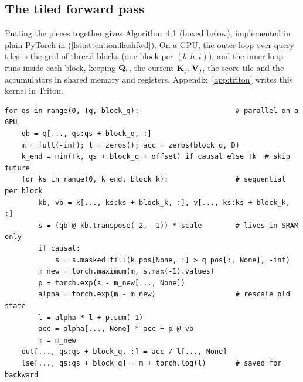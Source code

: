 \subsection{The tiled forward pass}
Putting the pieces together gives Algorithm~4.1 (boxed below), implemented in plain PyTorch in
 (\cref{lst:attention:flashfwd}). On a GPU, the outer loop over query tiles is
the grid of thread blocks (one block per $(b,h,i)$), and the inner loop runs inside each block,
keeping $\mathbf{Q}_i$, the current $\mathbf{K}_j,\mathbf{V}_j$, the score tile and the accumulators in
shared memory and registers. Appendix~\ref{app:triton} writes this kernel in Triton.

\begin{lstlisting}[caption={Tiled attention forward with online softmax (\texttt{llmsys/flash.py}, simplified).},label={lst:attention:flashfwd}]
for qs in range(0, Tq, block_q):                       # parallel on a GPU
    qb = q[..., qs:qs + block_q, :]
    m = full(-inf); l = zeros(); acc = zeros(block_q, D)
    k_end = min(Tk, qs + block_q + offset) if causal else Tk  # skip future
    for ks in range(0, k_end, block_k):                # sequential per block
        kb, vb = k[..., ks:ks + block_k, :], v[..., ks:ks + block_k, :]
        s = (qb @ kb.transpose(-2, -1)) * scale        # lives in SRAM only
        if causal:
            s = s.masked_fill(k_pos[None, :] > q_pos[:, None], -inf)
        m_new = torch.maximum(m, s.max(-1).values)
        p = torch.exp(s - m_new[..., None])
        alpha = torch.exp(m - m_new)                   # rescale old state
        l = alpha * l + p.sum(-1)
        acc = alpha[..., None] * acc + p @ vb
        m = m_new
    out[..., qs:qs + block_q, :] = acc / l[..., None]
    lse[..., qs:qs + block_q] = m + torch.log(l)       # saved for backward
\end{lstlisting}

